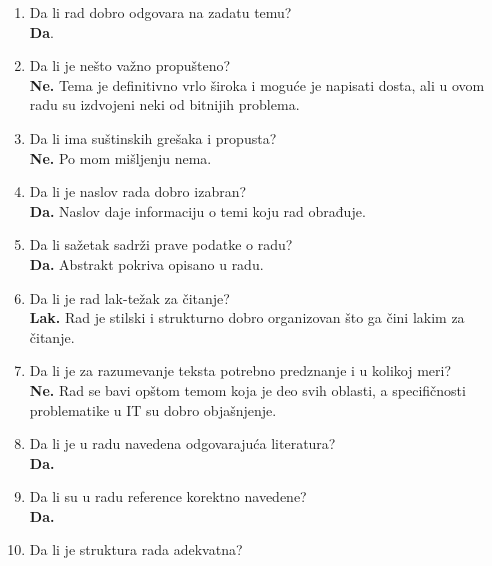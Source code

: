 \documentclass[a4paper]{report}
\begin{document}
\begin{enumerate}
\item Da li rad dobro odgovara na zadatu temu?\\

\textbf{Da}. 

\item Da li je nešto važno propušteno?\\

\textbf{Ne.} Tema je definitivno vrlo široka i moguće je napisati dosta, ali u ovom radu su izdvojeni neki od bitnijih problema.

\item Da li ima suštinskih grešaka i propusta?\\

\textbf{Ne.} Po mom mišljenju nema.

\item Da li je naslov rada dobro izabran?\\

\textbf{Da.} Naslov daje informaciju o temi koju rad obrađuje.

\item Da li sažetak sadrži prave podatke o radu?\\

\textbf{Da.} Abstrakt pokriva opisano u radu.

\item Da li je rad lak-težak za čitanje?\\

\textbf{Lak.} Rad je stilski i strukturno dobro organizovan što ga čini lakim za čitanje.

\item Da li je za razumevanje teksta potrebno predznanje i u kolikoj meri?\\

\textbf{Ne.} Rad se bavi opštom temom koja je deo svih oblasti, a specifičnosti problematike u IT su dobro objašnjenje.

\item Da li je u radu navedena odgovarajuća literatura?\\

\textbf{Da.}

\item Da li su u radu reference korektno navedene?\\

\textbf{Da.}

\item Da li je struktura rada adekvatna?\\


\end{enumerate}
\end{document}
